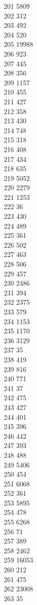{ 201	5809 \\
 202	312 \\
 203	492 \\
 204	520 \\
 205	19988 \\
 206	923 \\
 207	445 \\
 208	356 \\
 209	1157 \\
 210	455 \\
 211	427 \\
 212	358 \\
 213	430 \\
 214	748 \\
 215	318 \\
 216	408 \\
 217	434 \\
 218	635 \\
 219	5052 \\
 220	2279 \\
 221	1253 \\
 222	36 \\
 223	430 \\
 224	489 \\
 225	361 \\
 226	502 \\
 227	463 \\
 228	506 \\
 229	457 \\
 230	2486 \\
 231	394 \\
 232	2375 \\
 233	579 \\
 234	1153 \\
 235	1170 \\
 236	3129 \\
 237	35 \\
 238	419 \\
 239	816 \\
 240	771 \\
 241	37 \\
 242	475 \\
 243	427 \\
 244	401 \\
 245	396 \\
 246	442 \\
 247	393 \\
 248	488 \\
 249	5406 \\
 250	454 \\
 251	6068 \\
 252	361 \\
 253	5895 \\
 254	478 \\
 255	6268 \\
 256	71 \\
 257	389 \\
 258	2462 \\
 259	16053 \\
 260	212 \\
 261	475 \\
 262	23008 \\
 263	35 \\
}
